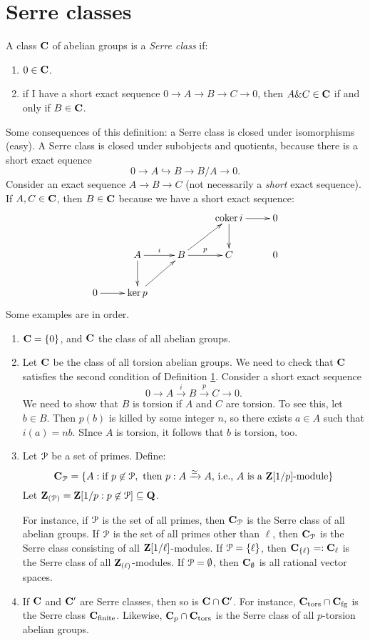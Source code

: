 \section{Serre classes}
\begin{definition}\label{serre-class}
    A class $\mathbf C$ of abelian groups is a \emph{Serre class} if:
    \begin{enumerate}
	\setcounter{enumi}{0}
	\item $0\in \mathbf C$.
	\item if I have a short exact sequence $0\to A\to B\to C\to 0$, then
	    $A\& C\in \mathbf C$ if and only if $B\in\mathbf C$.
    \end{enumerate}
\end{definition}
Some consequences of this definition: a Serre class is closed under
isomorphisms (easy). A Serre class is closed under subobjects and quotients,
because there is a short exact equence
$$0\to A\hookrightarrow B \to B/A\to 0.$$
Consider an exact sequence $A\to B\to C$ (not necessarily a \emph{short} exact
sequence). If $A,C\in \mathbf C$, then $B\in \mathbf C$ because we have a short exact
sequence:
$$
\xymatrix{
    & & & \coker i\ar[d]\ar[r] & 0\\
    & A\ar[r]^i\ar[d] & B\ar[r]^p\ar[ur] & C & 0\\
    0\ar[r] & \ker p\ar[ur] & & & 
}
$$
Some examples are in order.
\begin{example}
    \begin{enumerate}
	\item $\mathbf C = \{0\}$, and $\mathbf C$ the class of all abelian groups.
	\item Let $\mathbf C$ be the class of all torsion abelian groups. We need to
	    check that $\mathbf C$ satisfies the second condition of Definition
	    \ref{}. Consider a short exact sequence
	    $$0\to A\xrightarrow{i} B\xrightarrow{p} C\to 0.$$
	    We need to show that $B$ is torsion if $A$ and $C$ are torsion. To
	    see this, let $b\in B$. Then $p(b)$ is killed by some integer $n$,
	    so there exists $a\in A$ such that $i(a) = nb$. SInce $A$ is
	    torsion, it follows that $b$ is torsion, too.
	\item Let $\mathcal P$ be a set of primes. Define:
	    $$
	    \mathbf C_{\mathcal P} = \{ A : \text{if }p\not\in\mathcal P,\text{ then }p:A\xrightarrow{\simeq} A\text{, i.e., }A \text{ is a } \mathbf Z[1/p]\text{-module}\}
	    $$
	    Let $\mathbf Z_{(\mathcal P)} = \mathbf Z[1/p: p\not\in\mathcal P]\subseteq\mathbf Q$.
	    
	    For instance, if $\mathcal P$ is the set of all primes, then $\mathbf C_\mathcal P$ is
	    the Serre class of all abelian groups. If $\mathcal P$ is the set of all
	    primes other than $\ell$, then $\mathbf C_\mathcal P$ is the Serre class
	    consisting of all $\mathbf Z[1/\ell]$-modules. If $\mathcal P = \{\ell\}$, then
	    $\mathbf C_{\{\ell\}} =: \mathbf C_\ell$ is the Serre class of all
	    $\mathbf Z_{(\ell)}$-modules. If $\mathcal P = \emptyset$, then $\mathbf C_\emptyset$
	    is all rational vector spaces.
	\item If $\mathbf C$ and $\mathbf C^\prime$ are Serre classes, then so is $\mathbf C\cap
	    \mathbf C^\prime$. For instance, $\mathbf C_\text{tors} \cap \mathbf C_\text{fg}$ is
	    the Serre class $\mathbf C_\text{finite}$. Likewise, $\mathbf C_p \cap
	    \mathbf C_\text{tors}$ is the Serre class of all $p$-torsion abelian
	    groups.
    \end{enumerate}
\end{example}
